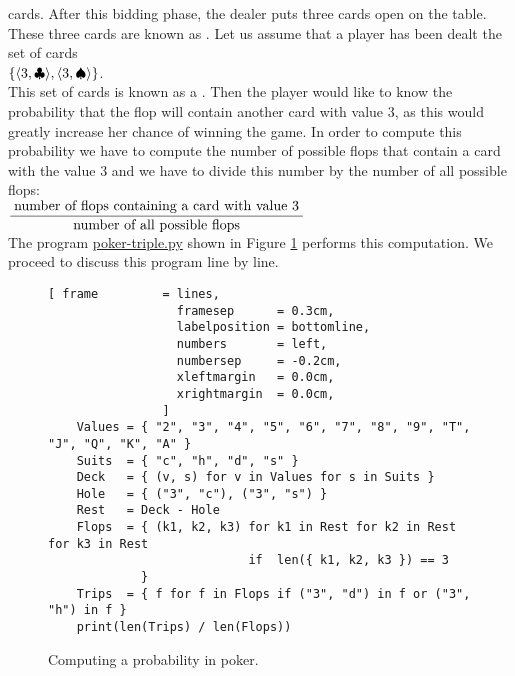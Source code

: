 cards.   After this bidding phase, the dealer puts three cards open on the table.  These three cards are
known as .  Let us assume that a player has been dealt the set of cards
\\[0.2cm]
\hspace*{1.3cm}
$\{ \pair(3, \club), \pair(3, \spade) \}$.
\\[0.2cm]
This set of cards is known as a .  Then the player would like to know the probability
that the flop will contain another card with value $3$, as this would greatly increase her chance of
winning the game.  In order to compute this probability we have to compute the number of possible
flops that contain a card with the value $3$ and we have to divide this number by the number of all
possible flops:
\\[0.2cm]
\hspace*{1.3cm}
$\displaystyle \frac{\;\mbox{number of flops containing a card with value $3$}\;}{\mbox{number of all possible flops}}$
\\[0.2cm]
The program
\href{https://github.com/karlstroetmann/Logik/blob/master/Python/poker-triple.py}{poker-triple.py}
shown in Figure \ref{fig:poker-triple.py} performs this computation.  We proceed to discuss this
program line by line.


\begin{figure}[!ht]
\centering
\begin{Verbatim}[ frame         = lines, 
                  framesep      = 0.3cm, 
                  labelposition = bottomline,
                  numbers       = left,
                  numbersep     = -0.2cm,
                  xleftmargin   = 0.0cm,
                  xrightmargin  = 0.0cm,
                ]
    Values = { "2", "3", "4", "5", "6", "7", "8", "9", "T", "J", "Q", "K", "A" } 
    Suits  = { "c", "h", "d", "s" }
    Deck   = { (v, s) for v in Values for s in Suits }
    Hole   = { ("3", "c"), ("3", "s") }
    Rest   = Deck - Hole
    Flops  = { (k1, k2, k3) for k1 in Rest for k2 in Rest for k3 in Rest 
                            if  len({ k1, k2, k3 }) == 3 
             }
    Trips  = { f for f in Flops if ("3", "d") in f or ("3", "h") in f }
    print(len(Trips) / len(Flops))
\end{Verbatim}
\vspace*{-0.3cm}
\caption{Computing a probability in poker.}
\label{fig:poker-triple.py}
\end{figure}

